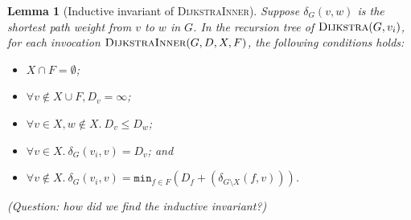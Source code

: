 \documentclass[11pt,a4paper,oneside,microtype,nokorean]{oblivoir}
\newtheorem{lemma}[theorem]{Lemma}
\begin{document}
\begin{lemma}[Inductive invariant of \textsc{DijkstraInner}] Suppose $\delta_G(v,w)$ is the shortest
  path weight from $v$ to $w$ in $G$.  In the recursion tree of $\textsc{Dijkstra}(G,v_i)$, for each
  invocation $\textsc{DijkstraInner}(G,D,X,F)$, the following conditions holds:
  \begin{itemize}
  \item $X \cap F = \emptyset$;
  \item $\forall v \notin X \cup F, D_v = \infty$;
  \item $\forall v\in X, w \notin X.~D_v \le D_w$;
  \item $\forall v \in X.~\delta_G(v_i,v) = D_v$; and
  \item
    $\forall v \notin X.~\delta_G(v_i,v) = \texttt{min}_{f \in F} (D_f + (\delta_{G \setminus
      X}(f,v)))$.
  \end{itemize}

  (Question: how did we find the inductive invariant?)
\end{lemma}
\end{document}
